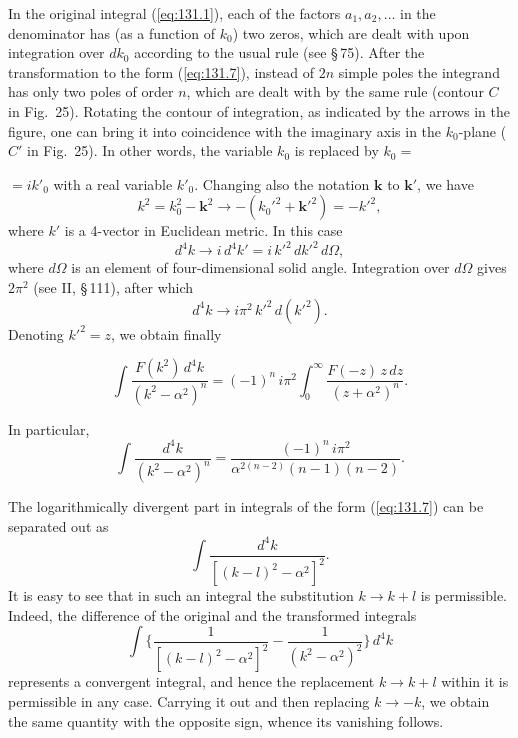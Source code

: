 In the original integral (\ref{eq:131.1}), each of the factors $a_1, a_2, \ldots$ in the denominator has (as a function of $k_0$) two zeros, which are dealt with upon integration over $dk_0$ according to the usual rule (see \S\,75). After the transformation to the form (\ref{eq:131.7}), instead of $2n$ simple poles the integrand has only two poles of order $n$, which are dealt with by the same rule (contour $C$ in Fig.~25). Rotating the contour of integration, as indicated by the arrows in the figure, one can bring it into coincidence with the imaginary axis in the $k_0$-plane ($C'$ in Fig.~25). In other words, the variable $k_0$ is replaced by $k_0 =$


\noindent $= ik'_0$ with a real variable $k'_0$. Changing also the notation $\mathbf{k}$ to $\mathbf{k}'$, we have
\begin{equation}
k^2 = k_0^2 - \mathbf{k}^2 \to -(k_0'^2 + \mathbf{k}'^2) = -k'^2,
\label{eq:131.11}
\end{equation}
where $k'$ is a 4-vector in Euclidean metric. In this case
\[
d^4k \to i\,d^4k' = i\,k'^2\,dk'^2\,d\Omega,
\]
where $d\Omega$ is an element of four-dimensional solid angle. Integration over $d\Omega$ gives $2\pi^2$ (see II, \S\,111), after which
\begin{equation}
d^4k \to i\pi^2\,k'^2\,d(k'^2).
\label{eq:131.12}
\end{equation}
Denoting $k'^2 = z$, we obtain finally


\begin{equation}
\int \frac{F(k^2)\,d^4k}{(k^2 - \alpha^2)^n} = (-1)^n\,i\pi^2 \int_0^\infty \frac{F(-z)\,z\,dz}{(z + \alpha^2)^n}.
\label{eq:131.13}
\end{equation}

In particular,
\begin{equation}
\int \frac{d^4k}{(k^2 - \alpha^2)^n} = \frac{(-1)^n\,i\pi^2}{\alpha^{2(n-2)}(n-1)(n-2)}.
\label{eq:131.14}
\end{equation}

The logarithmically divergent part in integrals of the form (\ref{eq:131.7}) can be separated out as
\begin{equation}
\int \frac{d^4k}{[(k-l)^2 - \alpha^2]^2}.
\label{eq:131.15}
\end{equation}
It is easy to see that in such an integral the substitution $k \to k + l$ is permissible. Indeed, the difference of the original and the transformed integrals
\[
\int \biggl\{\frac{1}{[(k-l)^2 - \alpha^2]^2} - \frac{1}{(k^2 - \alpha^2)^2}\biggr\}\,d^4k
\]
represents a convergent integral, and hence the replacement $k \to k + l$ within it is permissible in any case. Carrying it out and then replacing $k \to -k$, we obtain the same quantity with the opposite sign, whence its vanishing follows.

